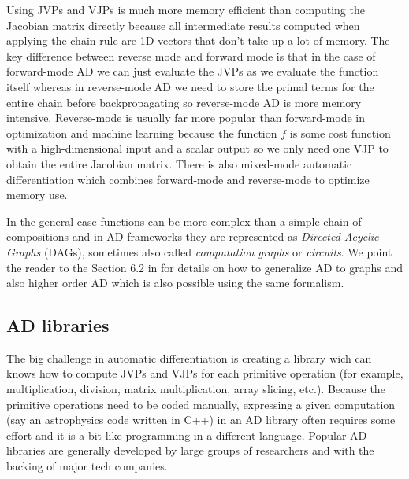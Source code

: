 \documentclass[12pt,dvipsnames]{report}
\newcommand{\ssf}[1]{\textsf{#1}}
\begin{document}
Using JVPs and VJPs is much more memory efficient than computing the Jacobian matrix directly 
because all intermediate results computed when applying the chain rule are 1D vectors that 
don't take up a lot of memory. The key difference between reverse mode and  forward mode is that 
in the case of forward-mode AD we can just evaluate the JVPs as we evaluate the function itself 
whereas in reverse-mode AD we need to store the primal terms for the entire chain before 
backpropagating so reverse-mode AD is more memory intensive.
Reverse-mode is usually far more popular than forward-mode in optimization and machine learning 
because the function $f$ is some cost function with  a high-dimensional input and a scalar 
output so we only need one VJP to obtain the entire Jacobian matrix. There is also mixed-mode 
automatic differentiation which combines forward-mode and reverse-mode to optimize memory use.

In the general case functions can be more complex than a simple chain of compositions and in AD 
frameworks they are represented as \textsl{Directed Acyclic Graphs} (DAGs), sometimes also 
called \textsl{computation graphs} or \textsl{circuits}. We point the reader to the Section 
6.2 in \citep{murphy_book_2023} for details on how to generalize AD to graphs and also higher 
order AD which is also possible using the same formalism. 

\subsection{AD libraries}
\label{ssec:ad_libraries}
The big challenge in automatic differentiation is creating a library wich can knows how to compute 
JVPs and VJPs for each primitive operation (for example, multiplication, division, 
matrix multiplication, array slicing, etc.).
Because the primitive operations need to be coded 
manually, expressing a given computation (say an astrophysics code written in \ssf{C++}) in 
an AD library often requires some effort and it is a bit like programming in a different 
language. 
Popular AD libraries are generally developed by large groups of researchers and with the backing 
of major tech companies.
\end{document}
